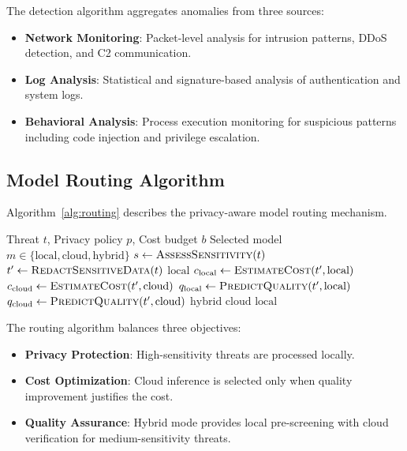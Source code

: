 The detection algorithm aggregates anomalies from three sources:
\begin{itemize}
    \item \textbf{Network Monitoring}: Packet-level analysis for intrusion patterns, DDoS detection, and C2 communication.
    \item \textbf{Log Analysis}: Statistical and signature-based analysis of authentication and system logs.
    \item \textbf{Behavioral Analysis}: Process execution monitoring for suspicious patterns including code injection and privilege escalation.
\end{itemize}

\subsection{Model Routing Algorithm}
\label{subsec:routing-algorithm}

Algorithm~\ref{alg:routing} describes the privacy-aware model routing mechanism.

\begin{algorithm}
\caption{Model Routing Algorithm}
\label{alg:routing}
\begin{algorithmic}[1]
\Require Threat $t$, Privacy policy $p$, Cost budget $b$
\Ensure Selected model $m \in \{\text{local}, \text{cloud}, \text{hybrid}\}$
\State $s \leftarrow \textsc{AssessSensitivity}(t)$
\State $t' \leftarrow \textsc{RedactSensitiveData}(t)$ 
    \State \Return $\text{local}$
\EndIf
\State $c_{\text{local}} \leftarrow \textsc{EstimateCost}(t', \text{local})$
\State $c_{\text{cloud}} \leftarrow \textsc{EstimateCost}(t', \text{cloud})$
\State $q_{\text{local}} \leftarrow \textsc{PredictQuality}(t', \text{local})$
\State $q_{\text{cloud}} \leftarrow \textsc{PredictQuality}(t', \text{cloud})$
        \State \Return $\text{hybrid}$ 
    \Else
        \State \Return $\text{cloud}$
    \EndIf
\Else
    \State \Return $\text{local}$
\EndIf
\end{algorithmic}
\end{algorithm}

The routing algorithm balances three objectives:
\begin{itemize}
    \item \textbf{Privacy Protection}: High-sensitivity threats are processed locally.
    \item \textbf{Cost Optimization}: Cloud inference is selected only when quality improvement justifies the cost.
    \item \textbf{Quality Assurance}: Hybrid mode provides local pre-screening with cloud verification for medium-sensitivity threats.
\end{itemize}

